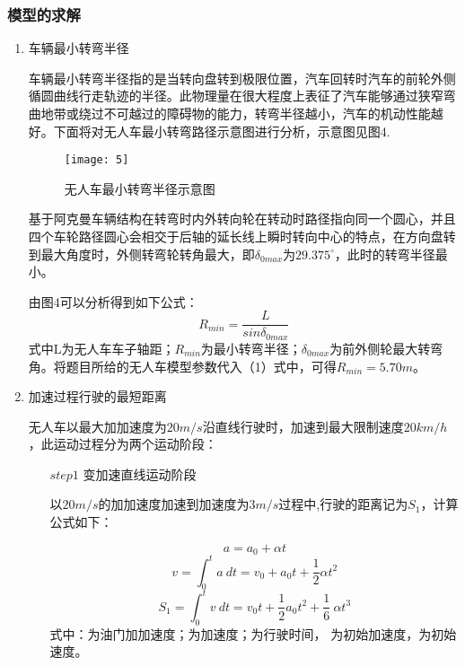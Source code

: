 \documentclass{MathorCupmodeling}
\begin{document}
	\subsubsection{模型的求解}
	\begin{enumerate}
		\item 车辆最小转弯半径

		车辆最小转弯半径指的是当转向盘转到极限位置，汽车回转时汽车的前轮外侧循圆曲线行走轨迹的半径。此物理量在很大程度上表征了汽车能够通过狭窄弯曲地带或绕过不可越过的障碍物的能力，转弯半径越小，汽车的机动性能越好。下面将对无人车最小转弯路径示意图进行分析，示意图见图4.
		\begin{figure}[H]
			\centering
			\texttt{[image: 5]}
			\caption{无人车最小转弯半径示意图}
			\label{fig:circuit-diagram}
		\end{figure}
		
		基于阿克曼车辆结构在转弯时内外转向轮在转动时路径指向同一个圆心，并且四个车轮路径圆心会相交于后轴的延长线上瞬时转向中心的特点，在方向盘转到最大角度时，外侧转弯轮转角最大，即$\delta_{0max}$为$29.375^{\circ}$，此时的转弯半径最小。
		
		由图4可以分析得到如下公式：
		\begin{equation}
		R_{min}=\frac{L}{sin\delta_{0max}}
		\end{equation}
		式中L为无人车车子轴距；$R_{min}$为最小转弯半径；$\delta_{0max}$为前外侧轮最大转弯角。将题目所给的无人车模型参数代入（1）式中，可得$R_{min}=5.70m$。
		\item 加速过程行驶的最短距离
	
		无人车以最大加加速度为$20 m/s$沿直线行驶时，加速到最大限制速度$20km/h$，此运动过程分为两个运动阶段：
			  \begin{itemize}
				  \item [$step1$]变加速直线运动阶段
				  
				  以$20 m/s$的加加速度加速到加速度为$3 m/s$过程中,行驶的距离记为$S_{1}$，计算公式如下：
				  
				  \begin{equation}
					a=a_0+\alpha t
				  \end{equation}
				  \begin{equation}
					v=\int_{0}^{t}{a\ dt=v_0+}a_0t+\frac{{1}}{2}\alpha t^2
				  \end{equation}
				  \begin{equation}
					S_1=\int_{0}^{t}{v\ dt=v_0t+\frac{{1}}{2}a_0t^2+}\frac{1}{6}\ \alpha t^3
				  \end{equation}
				  式中：为油门加加速度；为加速度；为行驶时间， 为初始加速度，为初始速度。
				  

\end{itemize}
\end{enumerate}
\end{document}
